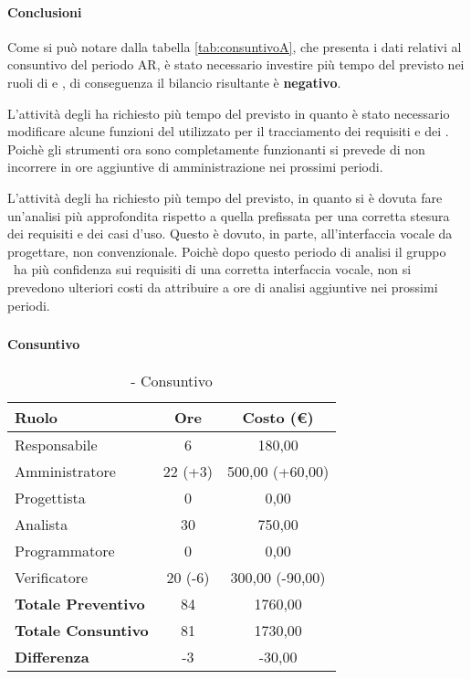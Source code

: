 \documentclass[./PianoDiProgetto.tex]{subfiles}
\begin{document}
  \paragraph{Conclusioni}
		Come si può notare dalla tabella \ref{tab:consuntivoA}, che presenta i dati relativi al consuntivo del periodo AR, è stato necessario investire più tempo del previsto nei ruoli di  \AMM{} e \AN, di conseguenza il bilancio risultante è \textbf{negativo}.

		L'attività degli \AMMP{} ha richiesto più tempo del previsto in quanto è stato necessario modificare alcune funzioni del  utilizzato per il tracciamento dei requisiti e dei . Poichè gli strumenti ora sono completamente funzionanti si prevede di non incorrere in ore aggiuntive di amministrazione nei prossimi periodi.

		L'attività degli \ANP{} ha richiesto più tempo del previsto, in quanto si è dovuta fare un'analisi più approfondita rispetto a quella prefissata per una corretta stesura dei requisiti e dei casi d'uso.
		Questo è dovuto, in parte, all'interfaccia vocale da progettare, non convenzionale.
		Poichè dopo questo periodo di analisi il gruppo \GRUPPO\ ha più confidenza sui requisiti di una corretta interfaccia vocale, non si prevedono ulteriori costi da attribuire a ore di analisi aggiuntive nei prossimi periodi.

\subsubsection{\PerAD}
	\paragraph{Consuntivo}
	\begin{table}[h]
		\centering
		\begin{tabular}{l * {2}{c}}
			\toprule
			\textbf{Ruolo} & \textbf{Ore} & \textbf{Costo (\euro{})} \\
			\midrule
			Responsabile &	6 & 180,00 \\
			Amministratore & 22 (+3)  & 500,00 (+60,00)\\
			Progettista & 0 & 0,00 \\
			Analista & 30 & 750,00\\
			Programmatore & 0 & 0,00 \\
			Verificatore & 20 (-6) & 300,00 (-90,00)\\
			\midrule
			\textbf{Totale Preventivo} & 84
 & 1760,00
 \\
			\textbf{Totale Consuntivo} & 81 & 1730,00 \\
			\midrule
			\textbf{Differenza} & -3 & -30,00 \\
			\bottomrule
		\end{tabular}
		\caption{\PerAD{} - Consuntivo}

	\end{table}
\end{document}
